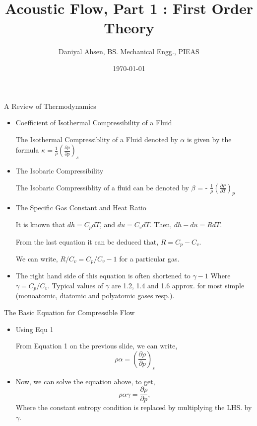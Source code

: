 \documentclass{beamer}
\title{Acoustic Flow, Part 1 : First Order Theory}
\author{Daniyal Ahsen, BS. Mechanical Engg., PIEAS}
\date{\today}
\begin{document}
\maketitle

\begin{frame}{A Review of Thermodynamics}

	\begin{itemize}
		\item{Coefficient of Isothermal Compressibility of a Fluid}

			The Isothermal Compressiblity of a Fluid denoted by $\alpha$ is given by the formula $\kappa = \frac{1}{\rho} (\frac{\partial \rho}{\partial p})_{\textit{s}}$

		\item{The Isobaric Compressibility}

			The Isobaric Compressiblity of a fluid can be denoted by 
			$\beta$ = - $\frac{1}{\rho} (\frac{\partial P}{\partial T})_p$ 


    \item{The Specific Gas Constant and Heat Ratio}

      It is known that $dh = C_p dT$, and $du = C_v dT$. Then, $dh-du = R dT$.

      From the last equation it can be deduced that, $R = C_p - C_v$.

      We can write, $R/C_v = C_p/C_v - 1$ for a particular gas.

	\item The right hand side of this equation is often shortened to $\gamma -1 $ Where $\gamma = C_p/C_v$. Typical values of $\gamma$ are 1.2, 1.4 and 1.6 approx. for most simple (monoatomic, diatomic and polyatomic gases resp.).
\end{itemize}
\end{frame}

\begin{frame}{The Basic Equation for Compressible Flow}
\begin{itemize}

	\item{Using Equ 1}
	
	From Equation 1 on the previous slide, we can write,
	\begin{equation}
	\rho \alpha = (\frac{\partial \rho}{\partial p})_{\textit{s}}
	\end{equation}
	\item{Now, } we can solve the equation above, to get,
	\begin{equation}
	\rho \alpha \gamma = \frac{\partial \rho}{\partial p},
	\end{equation}
	Where the constant entropy condition is replaced by multiplying the LHS. by $\gamma$.
	
\end{itemize}
\end{frame}
\end{document}

